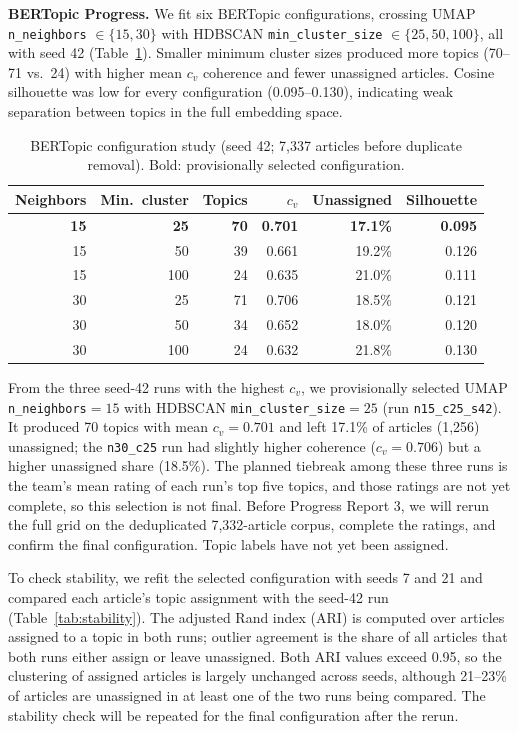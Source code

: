 \documentclass[conference]{IEEEtran}
\begin{document}
\textbf{BERTopic Progress.} We fit six BERTopic configurations, crossing UMAP \texttt{n\_neighbors} $\in\{15,30\}$ with HDBSCAN \texttt{min\_cluster\_size} $\in\{25,50,100\}$, all with seed 42 (Table~\ref{tab:bertopic-grid}). Smaller minimum cluster sizes produced more topics (70--71 vs.\ 24) with higher mean $c_v$ coherence and fewer unassigned articles. Cosine silhouette was low for every configuration (0.095--0.130), indicating weak separation between topics in the full embedding space.

\begin{table}[H]
\caption{BERTopic configuration study (seed 42; 7,337 articles before duplicate removal). Bold: provisionally selected configuration.}
\label{tab:bertopic-grid}
\centering
\footnotesize
\setlength{\tabcolsep}{3pt}
\begin{tabular}{rrrrrr}
\toprule
\textbf{Neighbors} & \textbf{Min.\ cluster} & \textbf{Topics} & \textbf{$c_v$} & \textbf{Unassigned} & \textbf{Silhouette} \\
\midrule
\textbf{15} & \textbf{25} & \textbf{70} & \textbf{0.701} & \textbf{17.1\%} & \textbf{0.095} \\
15 & 50  & 39 & 0.661 & 19.2\% & 0.126 \\
15 & 100 & 24 & 0.635 & 21.0\% & 0.111 \\
30 & 25  & 71 & 0.706 & 18.5\% & 0.121 \\
30 & 50  & 34 & 0.652 & 18.0\% & 0.120 \\
30 & 100 & 24 & 0.632 & 21.8\% & 0.130 \\
\bottomrule
\end{tabular}
\end{table}

From the three seed-42 runs with the highest $c_v$, we provisionally selected UMAP \texttt{n\_neighbors}$=15$ with HDBSCAN \texttt{min\_cluster\_size}$=25$ (run \texttt{n15\_c25\_s42}). It produced 70 topics with mean $c_v=0.701$ and left 17.1\% of articles (1,256) unassigned; the \texttt{n30\_c25} run had slightly higher coherence ($c_v=0.706$) but a higher unassigned share (18.5\%). The planned tiebreak among these three runs is the team's mean rating of each run's top five topics, and those ratings are not yet complete, so this selection is not final. Before Progress Report 3, we will rerun the full grid on the deduplicated 7,332-article corpus, complete the ratings, and confirm the final configuration. Topic labels have not yet been assigned.

To check stability, we refit the selected configuration with seeds 7 and 21 and compared each article's topic assignment with the seed-42 run (Table~\ref{tab:stability}). The adjusted Rand index (ARI) is computed over articles assigned to a topic in both runs; outlier agreement is the share of all articles that both runs either assign or leave unassigned. Both ARI values exceed 0.95, so the clustering of assigned articles is largely unchanged across seeds, although 21--23\% of articles are unassigned in at least one of the two runs being compared. The stability check will be repeated for the final configuration after the rerun.
\end{document}
